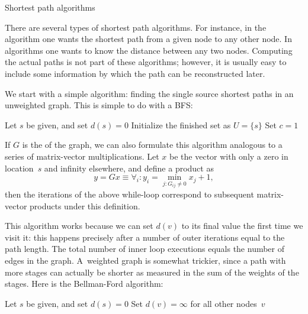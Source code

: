 {Shortest path algorithms}

There are several types of shortest path algorithms. For instance,
in the  algorithm
one wants the shortest path from a given node to any other node.
In  algorithms
one wants to know the distance between any two nodes.
Computing the actual paths is not part of these algorithms; 
however, it is usually easy to include some information by
which the path can be reconstructed later.

We start with a simple algorithm: finding the single source shortest
paths in an unweighted graph. This is simple to do with a \acf{BFS}:

\begin{displayalgorithm}
  Let $s$ be given, and set $d(s)=0$\;
  Initialize the finished set as $U=\{s\}$\;
  Set $c=1$\;
\end{displayalgorithm}

If $G$ is the  of the graph, we can
also formulate this algorithm analogous to a series of matrix-vector
multiplications. Let $x$ be the vector with only a zero in
location~$s$ and infinity elsewhere, and define a product as
\[ y=Gx\equiv \forall_i\colon
  y_i = \min_{j\colon G_{ij}\not=0} x_j+1,
\]
then the iterations of the above while-loop correspond to subsequent
matrix-vector products under this definition.

This algorithm works because we can set $d(v)$ to its final value
the first time we visit it: this happens precisely after a number of
outer iterations equal to the path length. The total number of inner loop
executions equals the number of edges in the graph.
A~weighted graph is somewhat trickier,
since a path with more stages can actually be shorter as measured in the sum
of the weights of the stages. Here is the Bellman-Ford algorithm:

\begin{displayalgorithm}
  Let $s$ be given, and set $d(s)=0$\;
  Set $d(v)=\infty$ for all other nodes~$v$\;
\end{displayalgorithm}

